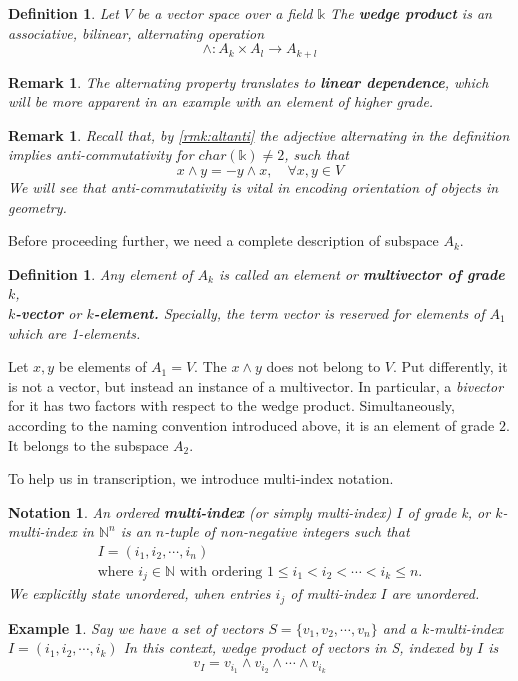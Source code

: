 \documentclass[12pt]{article}
\newtheorem{definition}[theorem]{Definition}
\newtheorem{notation}[theorem]{Notation}
\newtheorem{example}[theorem]{Example}
\newtheorem{remark}[theorem]{Remark}
\numberwithin{theorem}{section}
\numberwithin{equation}{theorem}
\newcommand{\kk}{\mathds{k}}
\begin{document}
\begin{definition}
    Let $V$ be a vector space over a field $\kk$ The \textbf{wedge product} is an associative, bilinear, alternating operation 
    $$\wedge : A_k \times A_l \to A_{k+l}$$
\end{definition}

\begin{remark}
    The \emph{alternating} property translates to \textbf{linear dependence}, which will be more apparent in an example with an element of higher grade.
\end{remark}
\begin{remark}
    Recall that, by \ref{rmk:altanti} the adjective \emph{alternating} in the definition implies \emph{anti-commutativity} for $char(\kk) \neq 2$, such that 
    $$x \wedge y = -y \wedge x, \quad \forall x, y \in V$$
    We will see that anti-commutativity is vital in encoding orientation of objects in geometry.
\end{remark}

Before proceeding further, we need a complete description of subspace $A_k$. 
\begin{definition}
    Any element of $A_k$ is called an element or \textbf{multivector of grade $k$},\\ \textbf{$k$-vector} or \textbf{$k$-element.} Specially, the term \emph{vector} is reserved for elements of $A_1$ which are 1-elements.
\end{definition}
Let $x, y$ be elements of $A_1 = V$. The $x \wedge y$ does not belong to $V$. Put differently, it is not a vector, but instead an instance of a multivector. In particular, a \emph{bivector} for it has two factors with respect to the wedge product. Simultaneously, according to the naming convention introduced above, it is an element of grade $2$. It belongs to the subspace $A_2$.

To help us in transcription, we introduce multi-index notation.

\begin{notation}
    An ordered \textbf{multi-index} (or simply multi-index) $I$ of grade k, or $k$-multi-index in $\mathbb{N}^n$ is an $n$-tuple of non-negative integers such that
    $$
    \begin{gathered}
    I = (i_1, i_2, \cdots , i_n) \\    
    \text{where } i_j \in \mathbb{N} \text{ with ordering } 1 \le i_1 < i_2 < \cdots <i_k \le n.
    \end{gathered}
    $$
    We explicitly state \emph{unordered}, when entries $i_j$ of multi-index $I$ are unordered.
\end{notation}
\begin{example}
    Say we have a set of vectors $S = \{v_1, v_2, \cdots, v_n\}$ and a $k$-multi-index $I = (i_1, i_2, \cdots, i_k)$ 
    In this context, wedge product of vectors in S, indexed by $I$ is 
    $$v_I = v_{i_1} \wedge v_{i_2} \wedge \cdots \wedge v_{i_k}$$
\end{example}
\end{document}
